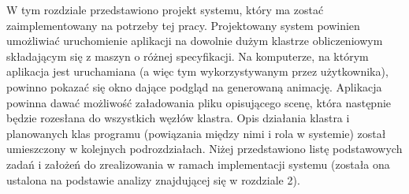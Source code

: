 W tym rozdziale przedstawiono projekt systemu, który ma zostać zaimplementowany na potrzeby tej pracy. Projektowany system powinien umożliwiać uruchomienie aplikacji na dowolnie dużym klastrze obliczeniowym składającym się z maszyn o różnej specyfikacji. Na komputerze, na którym aplikacja jest uruchamiana (a więc tym wykorzystywanym przez użytkownika), powinno pokazać się okno dające podgląd na generowaną animację. Aplikacja powinna dawać możliwość załadowania pliku opisującego scenę, która następnie będzie rozesłana do wszystkich węzłów klastra. Opis działania klastra i planowanych klas programu (powiązania między nimi i rola w systemie) został umieszczony w kolejnych podrozdziałach. Niżej przedstawiono listę podstawowych zadań i założeń do zrealizowania w ramach implementacji systemu (została ona ustalona na podstawie analizy znajdującej się w rozdziale 2).

